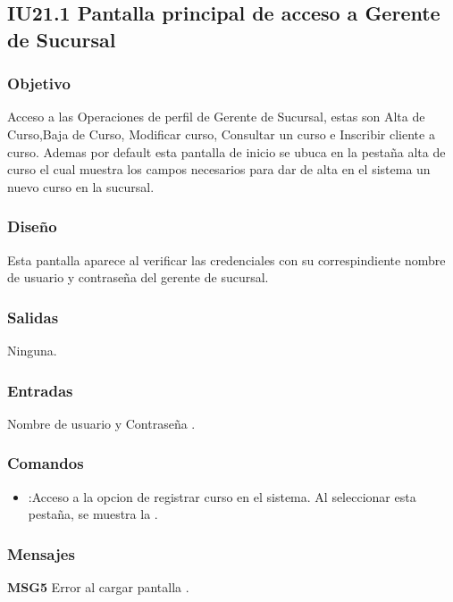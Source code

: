 \subsection{IU21.1 Pantalla principal de acceso a Gerente de Sucursal}

\subsubsection{Objetivo}
	Acceso a las Operaciones de perfil de Gerente de Sucursal, estas son Alta de Curso,Baja de Curso, Modificar curso, Consultar un curso e Inscribir cliente a curso.
	Ademas por default esta pantalla de inicio se ubuca en la pestaña alta de curso el cual muestra los campos necesarios para dar de alta en el sistema un nuevo curso en la sucursal.

\subsubsection{Diseño}
	Esta pantalla aparece al verificar las credenciales con su correspindiente nombre de usuario y contraseña del gerente de sucursal. 


\subsubsection{Salidas}

	Ninguna.

\subsubsection{Entradas}
Nombre de usuario y Contraseña .

\subsubsection{Comandos}
\begin{itemize}
	\item {}:Acceso a la opcion de registrar curso en el sistema. Al seleccionar esta pestaña, se muestra la .

\end{itemize}

\subsubsection{Mensajes}
	\begin{Citemize}
		\item {\bf MSG5} Error al cargar pantalla .
	\end{Citemize}
	
